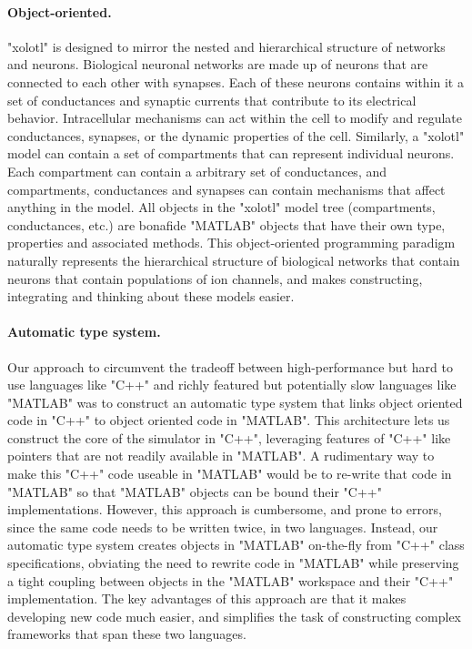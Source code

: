 \documentclass{frontiersSCNS} %
\begin{document}
\paragraph{Object-oriented.}
"xolotl" is designed to mirror the nested and hierarchical structure of networks and neurons. Biological neuronal networks are made up of neurons that are connected to each other with synapses. Each of these neurons contains within it a set of conductances and synaptic currents that contribute to its electrical behavior. Intracellular mechanisms can act within the cell to modify and regulate conductances, synapses, or the dynamic properties of the cell. Similarly, a "xolotl" model can contain a set of compartments that can represent individual neurons. Each compartment can contain a arbitrary set of conductances, and compartments, conductances and synapses can contain mechanisms that affect anything in the model. All objects in the "xolotl" model tree (compartments, conductances, etc.) are bonafide "MATLAB" objects that have their own type, properties and associated methods. This object-oriented programming paradigm naturally represents the hierarchical structure of biological networks that contain neurons that contain populations of ion channels, and makes constructing, integrating and thinking about these models easier.

\paragraph{Automatic type system.}
Our approach to circumvent the tradeoff between high-performance but hard to use languages like "C++" and richly featured but potentially slow languages like "MATLAB" was to construct an automatic type system that links object oriented code in "C++" to object oriented code in "MATLAB". This architecture lets us construct the core of the simulator in "C++", leveraging features of "C++" like pointers that are not readily available in "MATLAB". A rudimentary way to make this "C++" code useable in "MATLAB" would be to re-write that code in "MATLAB" so that "MATLAB" objects can be bound their "C++" implementations. However, this approach is cumbersome, and prone to errors, since the same code needs to be written twice, in two languages. Instead, our automatic type system creates objects in "MATLAB" on-the-fly  from "C++" class specifications, obviating the need to rewrite code in "MATLAB" while preserving a tight coupling between objects in the "MATLAB" workspace and their "C++" implementation. The key advantages of this approach are that it makes developing new code much easier, and simplifies the task of constructing complex frameworks that span these two languages.
\end{document}
